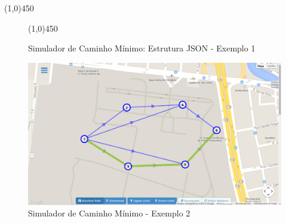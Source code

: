 \begin{center}
  \line(1,0){450}
\end{center}

\begin{figure}[htbp]
  \begin{center}
    \line(1,0){450}
  \end{center}
  \centering
  \caption{Simulador de Caminho Mínimo: Estrutura JSON - Exemplo 1}
  \label{fig:jsondyn1}
\end{figure}
\FloatBarrier


\begin{figure}[htbp]
\centering
 \includegraphics[width=.70\textwidth]{chapters/fig/validacao/ex2.png}
\caption{Simulador de Caminho Mínimo - Exemplo 2}
\label{fig:ex2}
\end{figure}
\FloatBarrier

